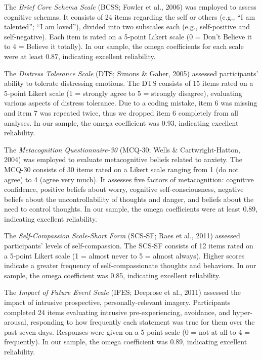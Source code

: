 \documentclass[
  man,floatsintext]{apa7}
\begin{document}
The \emph{Brief Core Schema Scale} (BCSS; Fowler et al., 2006) was employed to assess cognitive schemas.
It consists of 24 items regarding the self or others (e.g., ``I am talented''; ``I am loved''), divided into two subscales each (e.g., self-positive and self-negative).
Each item is rated on a 5-point Likert scale (0 = Don't Believe it to 4 = Believe it totally).
In our sample, the omega coefficients for each scale were at least 0.87, indicating excellent reliability.

The \emph{Distress Tolerance Scale} (DTS; Simons \& Gaher, 2005) assessed participants' ability to tolerate distressing emotions.
The DTS consists of 15 items rated on a 5-point Likert scale (1 = strongly agree to 5 = strongly disagree), evaluating various aspects of distress tolerance.
Due to a coding mistake, item 6 was missing and item 7 was repeated twice, thus we dropped item 6 completely from all analyses.
In our sample, the omega coefficient was 0.93, indicating excellent reliability.

The \emph{Metacognition Questionnaire-30} (MCQ-30; Wells \& Cartwright-Hatton, 2004) was employed to evaluate metacognitive beliefs related to anxiety.
The MCQ-30 consists of 30 items rated on a Likert scale ranging from 1 (do not agree) to 4 (agree very much).
It assesses five factors of metacognition: cognitive confidence, positive beliefs about worry, cognitive self-consciousness, negative beliefs about the uncontrollability of thoughts and danger, and beliefs about the need to control thoughts.
In our sample, the omega coefficients were at least 0.89, indicating excellent reliability.

The \emph{Self-Compassion Scale-Short Form} (SCS-SF; Raes et al., 2011) assessed participants' levels of self-compassion.
The SCS-SF consists of 12 items rated on a 5-point Likert scale (1 = almost never to 5 = almost always).
Higher scores indicate a greater frequency of self-compassionate thoughts and behaviors.
In our sample, the omega coefficient was 0.85, indicating excellent reliability.

The \emph{Impact of Future Event Scale} (IFES; Deeprose et al., 2011) assessed the impact of intrusive prospective, personally-relevant imagery.
Participants completed 24 items evaluating intrusive pre-experiencing, avoidance, and hyper-arousal, responding to how frequently each statement was true for them over the past seven days.
Responses were given on a 5-point scale (0 = not at all to 4 = frequently).
In our sample, the omega coefficient was 0.89, indicating excellent reliability.
\end{document}
